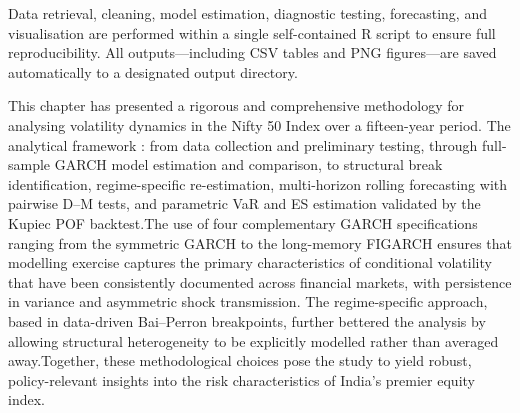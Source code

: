 Data retrieval, cleaning, model estimation, diagnostic testing, forecasting, and visualisation are performed within a single self-contained R script to ensure full reproducibility. All outputs—including CSV tables and PNG figures—are saved automatically to a designated output directory.


This chapter has presented a rigorous and comprehensive methodology for analysing
volatility dynamics in the Nifty 50 Index over a fifteen-year period. The analytical framework : from data collection and preliminary testing, through
full-sample GARCH model estimation and comparison, to structural break identification,
regime-specific re-estimation, multi-horizon rolling forecasting with pairwise D--M tests, and  parametric VaR and ES estimation validated by the Kupiec POF backtest.The use of four complementary GARCH specifications  ranging from the symmetric GARCH to the long-memory FIGARCH ensures that modelling exercise captures the primary characteristics of conditional 
volatility that have been consistently documented across financial markets, with persistence in variance and asymmetric shock transmission. The regime-specific approach, based in data-driven Bai–Perron breakpoints, further bettered the analysis by allowing structural heterogeneity to be explicitly modelled rather than averaged away.Together, these methodological choices pose the study to yield robust, policy-relevant insights into the risk characteristics of India’s premier equity index.